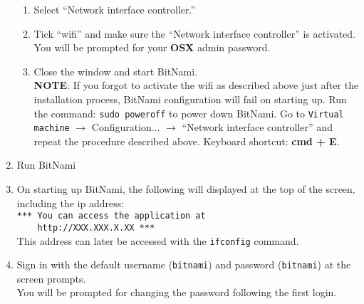\begin{enumerate}
\begin{enumerate}
		\item Select ``Network interface controller.''
		\item Tick ``wifi'' and make sure the ``Network interface controller'' is activated. You will be prompted for your \textbf{OSX} admin password.
		\item Close the window and start BitNami.\\
		\textbf{NOTE}: If you forgot to activate the wifi as described above just after the installation process, BitNami configuration will fail on starting up. Run the command: \texttt{sudo poweroff} to power down BitNami.  Go to \texttt{Virtual machine} $\rightarrow$ Configuration... $\rightarrow$ ``Network interface controller'' and repeat the procedure described above. Keyboard shortcut: \textbf{cmd + E}. 
		\end{enumerate}			
	\item Run BitNami
	\item On starting up BitNami, the following will displayed at the top of the screen, including the ip address: \\
		\texttt{*** You can access the application at\\~~~~http://XXX.XXX.X.XX ***} \\
		This address can later be accessed with the \texttt{ifconfig} command.
	\item Sign in with the default username (\texttt{bitnami}) and password (\texttt{bitnami}) at the screen prompts.\\
		You will be prompted for changing the password following the first login.
\end{enumerate}

